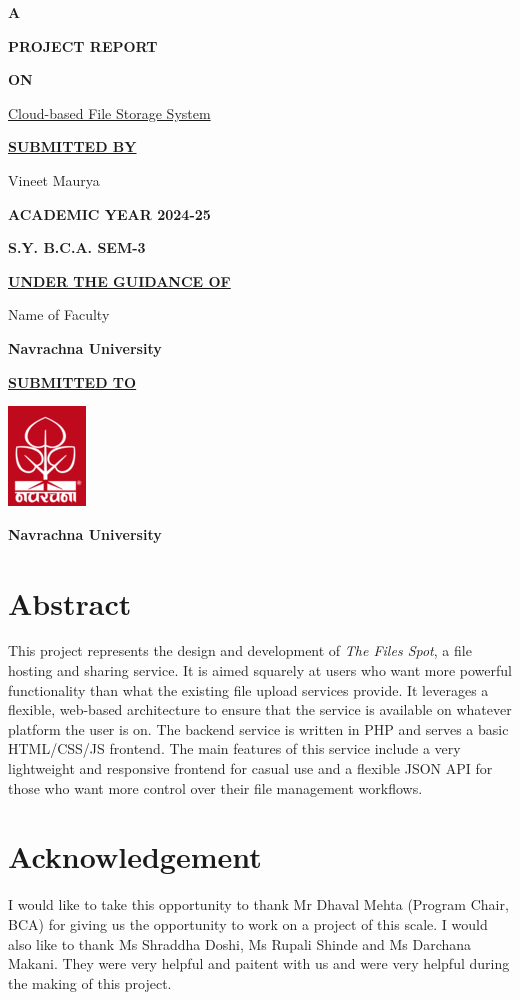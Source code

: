 \documentclass[12pt,a4paper]{report}
\begin{document}
\begin{center}
	\textbf{\LARGE{A}}

	\textbf{\LARGE{PROJECT REPORT}}

	\textbf{\LARGE{ON}}

	\Large{\underline{Cloud-based File Storage System}}
	\vspace{1cm}

	\textbf{\underline{SUBMITTED BY}}

	Vineet Maurya
	\vspace{1cm}

	\textbf{ACADEMIC YEAR 2024-25}

	\textbf{S.Y. B.C.A. SEM-3}
	\vspace{1cm}

	\textbf{\underline{UNDER THE GUIDANCE OF}}

	Name of Faculty

	\textbf{Navrachna University}
	\vspace{1cm}

	\textbf{\underline{SUBMITTED TO}}
	\vspace{0.5cm}

	\includegraphics{nuv_logo.png}
	\vspace{0.5cm}

	\textbf{Navrachna University}
\end{center}
\newpage
{}
\setcounter{page}{1}
\chapter*{Abstract}
This project represents the design and development of \textit{The Files Spot}, a file hosting and sharing service. It is aimed squarely at users who want more powerful functionality than what the existing file upload services provide. It leverages a flexible, web-based architecture to ensure that the service is available on whatever platform the user is on. The backend service is written in PHP and serves a basic HTML/CSS/JS frontend. The main features of this service include a very lightweight and responsive frontend for casual use and a flexible JSON API for those who want more control over their file management workflows.
\newpage
\chapter*{Acknowledgement}
I would like to take this opportunity to thank Mr Dhaval Mehta (Program Chair, BCA) for giving us the opportunity to work on a project of this scale.
I would also like to thank Ms Shraddha Doshi, Ms Rupali Shinde and Ms Darchana Makani. They were very helpful and paitent with us and were very helpful during the making of this project.
\newpage
\end{document}
